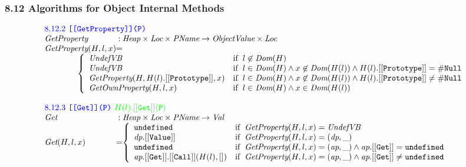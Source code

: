 \documentclass[a4paper, leqno]{amsart}
\newcommand{\rulesep}{\quad\quad}
\def\inred{\color{red}}
\def\inblue{\color{blue}}
\def\ingreen{\color{green}}
\newcommand{\strict}{{\inred\tt strict}}
\newcommand{\UndefVB}{\emph{UndefVB}}
\newcommand{\nullL}{{\tt \#Null}}
\newcommand{\undef}{{\tt undefined}}
\newcommand{\Val}{\emph{Val}}
\newcommand{\Loc}{\emph{Loc}}
\newcommand{\ObjV}{\emph{ObjectValue}}
\newcommand{\Heap}{\emph{Heap}}
\newcommand{\Prop}{\emph{PName}}
\newcommand{\hf}[1]{\emph{#1}}
\newcommand{\ifc}[1]{{\rm if}\begin{array}[t]{l}#1\end{array}}
\def\inred{\color{red}}
\def\inblue{\color{blue}}
\begin{document}
\subsubsection*{8.12 Algorithms for Object Internal Methods}
\[
\begin{array}{l@{}c@{}l}

\multicolumn{3}{l}{\mbox{\inblue 8.12.2 {\tt [[GetProperty]](P)}}}\\
\hf{GetProperty} & :& \Heap \times \Loc \times \Prop \rightarrow \ObjV \times \Loc \\
\hf{GetProperty}(H,l,x) &=\\
\multicolumn{3}{l}{
\rulesep\rulesep
\left\{\begin{array}{ll}
\UndefVB & \ifc{l\not\in \hf{Dom}(H)} \\
\UndefVB & \ifc{l\in\hf{Dom}(H)\wedge x\not\in\hf{Dom}(H(l)) \wedge
H(l).{\tt [[Prototype]]} = \nullL} \\
\hf{GetProperty}(H,H(l).{\tt [[Prototype]]},x) &
\ifc{l\in\hf{Dom}(H)\wedge x\not\in\hf{Dom}(H(l)) \wedge
H(l).{\tt [[Prototype]]} \not= \nullL}\\
\hf{GetOwnProperty}(H,l,x) &
\ifc{l\in\hf{Dom}(H)\wedge x\in\hf{Dom}(H(l))}
\end{array}\right.
}
\\\\

\multicolumn{3}{l}{\mbox{\inblue 8.12.3 {\tt [[Get]](P)} {\ingreen$H(l).{\tt[[Get]](P)}$}}}\\
\hf{Get} & :& \Heap \times \Loc \times \Prop \rightarrow \Val \\
\hf{Get}(H,l,x) &=&
\left\{\begin{array}{ll}
\undef & \ifc{\hf{GetProperty}(H,l,x) = \UndefVB} \\
\emph{dp}.{\tt[[Value]]} & \ifc{\hf{GetProperty}(H,l,x) = (\emph{dp}, \_)} \\
\undef & \ifc{\hf{GetProperty}(H,l,x) = (\emph{ap}, \_) \wedge
\emph{ap}.{\tt[[Get]]} = \undef} \\
\emph{ap}.{\tt[[Get]]}.{\tt[[Call]]}(H(l),[])
 & \ifc{\hf{GetProperty}(H,l,x) = (\emph{ap}, \_) \wedge
\emph{ap}.{\tt[[Get]]} \not= \undef} \\
\end{array}\right.
\\\\


\end{array}\]
\end{document}
